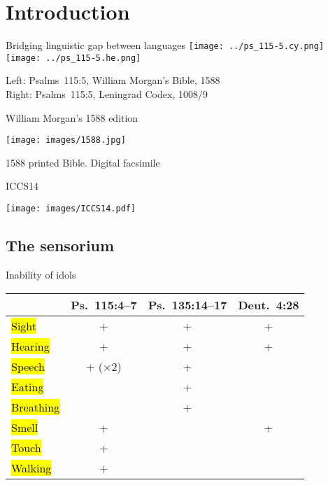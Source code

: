 \setcounter{section}{-1}
\section{Introduction}

\begin{frame}{Bridging linguistic gap between languages}
	\texttt{[image: ../ps\_115-5.cy.png]}
	\hfill
	\texttt{[image: ../ps\_115-5.he.png]}

	\vfill

	Left: Psalms~115:5, William Morgan’s Bible, 1588\\
	Right: Psalms~115:5, Leningrad Codex, 1008/9
\end{frame}



\begin{frame}{William Morgan’s 1588 edition}
	\begin{center}
		\texttt{[image: images/1588.jpg]}

		\vfill

		1588 printed Bible. Digital facsimile
	\end{center}
\end{frame}


\begin{frame}{ICCS14}
	\begin{center}
		\texttt{[image: images/ICCS14.pdf]}
	\end{center}
\end{frame}



\subsection{The sensorium}

\begin{frame}{Inability of idols}
	\begin{tabular}{l|ccc}
		& Ps.~115:4–7 & Ps.~135:14–17 & Deut.~4:28\\
		\hline
		\hl{Sight}     & +           & +             & +\\
		\hl{Hearing}   & +           & +             & +\\
		\hl{Speech}    & + (×2)      & +             & \\
		\hl{Eating}    &             & +             & \\
		\hl{Breathing} &             & +             & \\
		\hl{Smell}     & +           &               & +\\
		\hl{Touch}     & +           &               & \\
		\hl{Walking}   & +           &               & 
	\end{tabular}

\end{frame}



